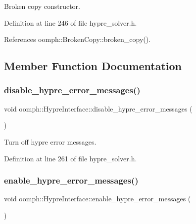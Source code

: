 Broken copy constructor. 



Definition at line 246 of file hypre\+\_\+solver.\+h.



References oomph\+::\+Broken\+Copy\+::broken\+\_\+copy().



\subsection{Member Function Documentation}
\mbox{\label{classoomph_1_1HypreInterface_a5123a1836f5d9f68bc6736829132b5a5}} 
\subsubsection{\texorpdfstring{disable\+\_\+hypre\+\_\+error\+\_\+messages()}{disable\_hypre\_error\_messages()}}
{\footnotesize\ttfamily void oomph\+::\+Hypre\+Interface\+::disable\+\_\+hypre\+\_\+error\+\_\+messages (\begin{DoxyParamCaption}{ }\end{DoxyParamCaption})\hspace{0.3cm}{\ttfamily [inline]}}



Turn off hypre error messages. 



Definition at line 261 of file hypre\+\_\+solver.\+h.

\mbox{\label{classoomph_1_1HypreInterface_a281c9cf1e254871a957dbf46698cd518}} 
\subsubsection{\texorpdfstring{enable\+\_\+hypre\+\_\+error\+\_\+messages()}{enable\_hypre\_error\_messages()}}
{\footnotesize\ttfamily void oomph\+::\+Hypre\+Interface\+::enable\+\_\+hypre\+\_\+error\+\_\+messages (\begin{DoxyParamCaption}{ }\end{DoxyParamCaption})\hspace{0.3cm}{\ttfamily [inline]}}



